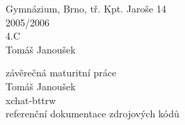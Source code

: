 \noindent{}Gymn\'azium, Brno, t\v{r}. Kpt. Jaro\v{s}e 14\\
2005/2006\\
4.C\\
Tom\'a\v{s} Janou\v{s}ek
\vspace*{7cm}
\begin{center}
\Large z\'av\v{e}re\v{c}n\'a maturitn\'i pr\'ace \\
\LARGE Tom\'a\v{s} Janou\v{s}ek \\[1mm]
\huge xchat-bttrw\\[2mm]
\Large referen\v{c}n\'i dokumentace zdrojov\'ych k\'od\r{u}
\end{center}
